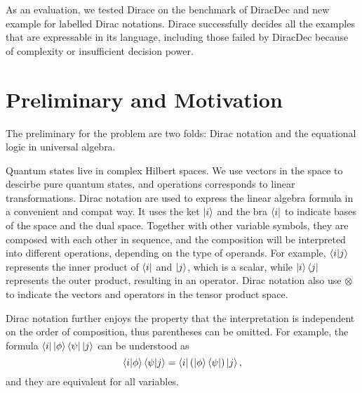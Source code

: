 \documentclass[runningheads]{llncs}
\begin{document}
As an evaluation, we tested Dirace on the benchmark of DiracDec and new example for labelled Dirac notations. Dirace successfully decides all the examples that are expressable in its language, including those failed by DiracDec because of complexity or insufficient decision power.





\section{Preliminary and Motivation}
The preliminary for the problem are two folds: Dirac notation and the equational logic in universal algebra.

Quantum states live in complex Hilbert spaces. We use vectors in the space to descirbe pure quantum states, and operations corresponds to linear transformations. 
Dirac notation are used to express the linear algebra formula in a convenient and compat way.
It uses the ket $\ket{i}$ and the bra $\bra{i}$ to indicate bases of the space and the dual space. Together with other variable symbols, they are composed with each other in sequence, and the composition will be interpreted into different operations, depending on the type of operands. For example, $\braket{i|j}$ represents the inner product of $\bra{i}$ and $\ket{j}$, which is a scalar, while $\ket{i}\bra{j}$ represents the outer product, resulting in an operator. 
Dirac notation also use $\otimes$ to indicate the vectors and operators in the tensor product space.

Dirac notation further enjoys the property that the interpretation is independent on the order of composition, thus parentheses can be omitted. For example, the formula \(\bra{i}\ket{\phi}\bra{\psi}\ket{j}\) can be understood as
\[
    \braket{i|\phi}\braket{\psi|j} = \bra{i} (\ket{\phi}\bra{\psi}) \ket{j},
\]
and they are equivalent for all variables.
\end{document}
